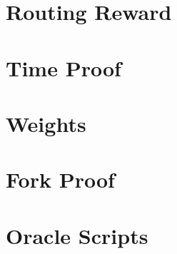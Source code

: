 \documentclass[a4paper,10pt]{article}
\begin{document}
\section{Routing Reward}
\section{Time Proof}
\section{Weights}
\section{Fork Proof}
\section{Oracle Scripts}
\end{document}
